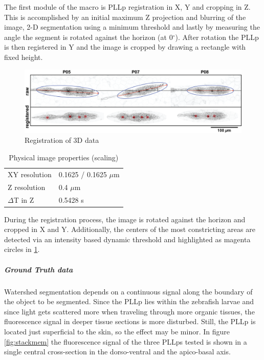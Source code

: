 \documentclass[11pt,singlespacinge,twoside]{reedthesis} %
\begin{document}
The first module of the macro is PLLp registration in X, Y and cropping in Z. This is accomplished by an initial maximum Z projection and blurring of the image, 2-D segmentation using a minimum threshold and lastly by measuring the angle the segment is rotated against the horizon (at 0\(^{\circ}\)). After rotation the PLLp is then registered in Y and the image is cropped by drawing a rectangle with fixed height.


\begin{figure}

{\centering \includegraphics[width=0.9\linewidth]{figures/materials/ground_truth/registration} 

}

\caption{Registration of 3D data}\label{fig:maxraw}
\end{figure}
\begin{table}[!h]

\caption{\label{tab:imgprop}Physical image properties (scaling)}
\centering
\begin{tabu} to 
\toprule
{}  XY resolution & 0.1625 / 0.1625 $\mu$m\\
Z resolution & 0.4 $\mu$m\\
  $\Delta$T in Z & 0.5428 s\\
\bottomrule
\end{tabu}
\end{table}
During the registration process, the image is rotated against the horizon and cropped in X and Y. Additionally, the centers of the most constricting areas are detected via an intensity based dynamic threshold and highlighted as magenta circles in \ref{fig:maxraw}.

\hypertarget{ground-truth-data}{%
\subparagraph{Ground Truth data}\label{ground-truth-data}}

Watershed segmentation depends on a continuous signal along the boundary of the object to be segmented. Since the PLLp lies within the zebrafish larvae and since light gets scattered more when traveling through more organic tissues, the fluorescence signal in deeper tissue sections is more disturbed. Still, the PLLp is located just superficial to the skin, so the effect may be minor. In figure \ref{fig:stackmem} the fluorescence signal of the three PLLps tested is shown in a single central cross-section in the dorso-ventral and the apico-basal axis.
\end{document}
